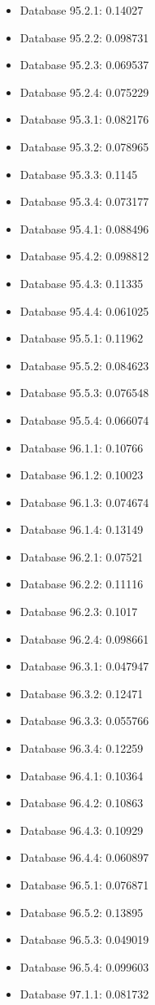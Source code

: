 \begin{itemize}
\item Database 95.2.1: 0.14027
\item Database 95.2.2: 0.098731
\item Database 95.2.3: 0.069537
\item Database 95.2.4: 0.075229
\item Database 95.3.1: 0.082176
\item Database 95.3.2: 0.078965
\item Database 95.3.3: 0.1145
\item Database 95.3.4: 0.073177
\item Database 95.4.1: 0.088496
\item Database 95.4.2: 0.098812
\item Database 95.4.3: 0.11335
\item Database 95.4.4: 0.061025
\item Database 95.5.1: 0.11962
\item Database 95.5.2: 0.084623
\item Database 95.5.3: 0.076548
\item Database 95.5.4: 0.066074
\item Database 96.1.1: 0.10766
\item Database 96.1.2: 0.10023
\item Database 96.1.3: 0.074674
\item Database 96.1.4: 0.13149
\item Database 96.2.1: 0.07521
\item Database 96.2.2: 0.11116
\item Database 96.2.3: 0.1017
\item Database 96.2.4: 0.098661
\item Database 96.3.1: 0.047947
\item Database 96.3.2: 0.12471
\item Database 96.3.3: 0.055766
\item Database 96.3.4: 0.12259
\item Database 96.4.1: 0.10364
\item Database 96.4.2: 0.10863
\item Database 96.4.3: 0.10929
\item Database 96.4.4: 0.060897
\item Database 96.5.1: 0.076871
\item Database 96.5.2: 0.13895
\item Database 96.5.3: 0.049019
\item Database 96.5.4: 0.099603
\item Database 97.1.1: 0.081732

\end{itemize}
